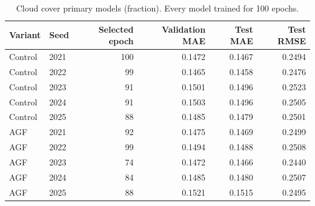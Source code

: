 \documentclass[10pt,a4paper]{article}
\begin{document}
\begin{table}[H]\centering\small\setlength{\tabcolsep}{5pt}\setlength{\parskip}{0pt}

\caption{Cloud cover primary models (fraction). Every model trained for 100 epochs.}\label{tab:seeds_cloud_cover}

\begin{tabular}{llrrrr}

\toprule
Variant & Seed & Selected epoch & Validation MAE & Test MAE & Test RMSE \\
\midrule

Control & 2021 & 100 & 0.1472 & 0.1467 & 0.2494 \\

Control & 2022 & 99 & 0.1465 & 0.1458 & 0.2476 \\

Control & 2023 & 91 & 0.1501 & 0.1496 & 0.2523 \\

Control & 2024 & 91 & 0.1503 & 0.1496 & 0.2505 \\

Control & 2025 & 88 & 0.1485 & 0.1479 & 0.2501 \\

AGF & 2021 & 92 & 0.1475 & 0.1469 & 0.2499 \\

AGF & 2022 & 99 & 0.1494 & 0.1488 & 0.2508 \\

AGF & 2023 & 74 & 0.1472 & 0.1466 & 0.2440 \\

AGF & 2024 & 84 & 0.1485 & 0.1480 & 0.2507 \\

AGF & 2025 & 88 & 0.1521 & 0.1515 & 0.2495 \\

\bottomrule\end{tabular}\end{table}
\end{document}
